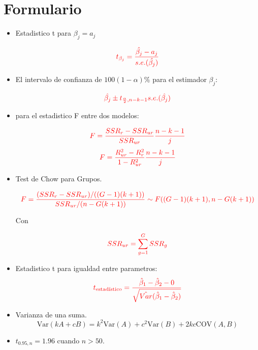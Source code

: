 \documentclass[10pt,a4paper]{article}
\begin{document}
 
\section*{Formulario}
\begin{itemize}

\item Estadistico t para $\beta_j = a_j$

$$\color{red}{t_{\beta_j}=\frac{\hat{\beta_j}-a_j}{s.e.(\hat{\beta_j})}}$$

\item El intervalo de confianza de $100(1-\alpha)\%$ para el estimador $\beta_j$:

$${\color{red}\hat{\beta_j} \pm t_{\frac{\alpha}{2},n-k-1}s.e.(\hat{\beta_j})}$$


\item para el estadistico F entre dos modelos:

$$\color{red}{F=\frac{SSR_r-SSR_{ur}}{SSR_{ur}}\frac{n-k-1}{j}}$$
$$\color{red}{F=\frac{R^2_{ur}-R^2_{r}}{1-R^2_{ur}}\frac{n-k-1}{j}}$$

\item Test de Chow para Grupos.

    \[\color{red}
    F = \frac{(SSR_r - SSR_{ur}) / ((G - 1)(k + 1))}{SSR_{ur} / (n - G(k + 1))} \sim F((G - 1)(k + 1), n - G(k + 1))
    \]

Con

$$\color{red}SSR_{ur} = \sum_{g=1}^G SSR_g$$

\item Estadistico t para igualdad entre parametros:
 \[\color{red}t_{\text{estadístico}} = \frac{\hat{\beta}_1 - \hat{\beta}_2 - 0}{\sqrt{\hat{Var}(\hat{\beta}_1 - \hat{\beta}_2)}}\]


\item  Varianza de una suma.
{\color{red}
$$\text{Var}(kA + cB) = k^2\text{Var}(A) + c^2\text{Var}(B) + 2kc\text{COV}(A, B)$$}

\item $t_{0.95,n} = 1.96$ cuando $n >50$.

\end{itemize}
\end{document}
